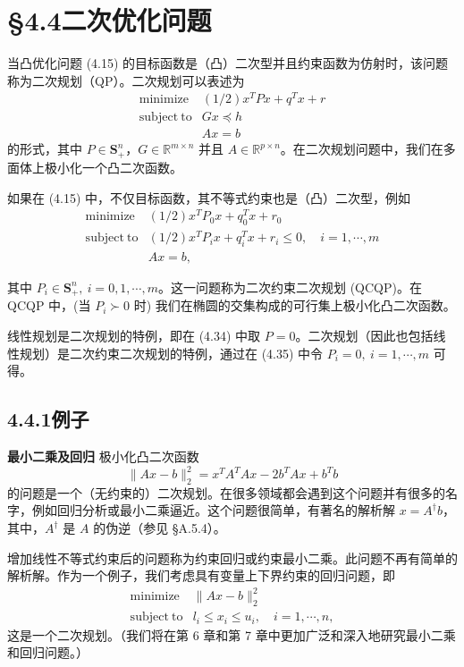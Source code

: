 \documentclass[UTF8, 12pt, fontset=fandol, oneside]{ctexart}
\begin{document}
\section*{§4.4\quad 二次优化问题}

当凸优化问题 (4.15) 的目标函数是（凸）二次型并且约束函数为仿射时，该问题称为二次规划（QP）。二次规划可以表述为
\begin{equation}
\begin{array}{ll}
\mathop{\mathrm{minimize}} & (1/2)x^TPx+q^Tx+r\\
\mathrm{subject\ to} & Gx\preceq h\\
& Ax=b
\end{array}
\tag{4.34}
\end{equation}
的形式，其中 $P\in\mathbf{S}_+^n$，$G\in\mathbb{R}^{m\times n}$ 并且 $A\in\mathbb{R}^{p\times n}$。在二次规划问题中，我们在多面体上极小化一个凸二次函数。

如果在 (4.15) 中，不仅目标函数，其不等式约束也是（凸）二次型，例如
\begin{equation}
\begin{array}{ll}
\mathop{\mathrm{minimize}} & (1/2)x^TP_0x+q_0^Tx+r_0\\
\mathrm{subject\ to} & (1/2)x^TP_ix+q_i^Tx+r_i\leq 0,\quad i=1,\cdots,m\\
& Ax=b,
\end{array}
\tag{4.35}
\end{equation}

其中 $P_i\in \mathbf{S}_+^n,\ i=0,1,\cdots,m$。这一问题称为二次约束二次规划 (QCQP)。在 QCQP 中，(当 $P_i\succ 0$ 时) 我们在椭圆的交集构成的可行集上极小化凸二次函数。

线性规划是二次规划的特例，即在 (4.34) 中取 $P=0$。二次规划（因此也包括线性规划）是二次约束二次规划的特例，通过在 (4.35) 中令 $P_i=0,\ i=1,\cdots,m$ 可得。

\subsection*{4.4.1\quad 例子}

\noindent\textbf{最小二乘及回归}\quad
极小化凸二次函数
\[
\|Ax-b\|_2^2=x^TA^TAx-2b^TAx+b^Tb
\]
的问题是一个（无约束的）二次规划。在很多领域都会遇到这个问题并有很多的名字，例如回归分析或最小二乘逼近。这个问题很简单，有著名的解析解 $x=A^\dagger b$，其中，$A^\dagger$ 是 $A$ 的伪逆（参见 \S A.5.4）。

增加线性不等式约束后的问题称为约束回归或约束最小二乘。此问题不再有简单的解析解。作为一个例子，我们考虑具有变量上下界约束的回归问题，即
\[
\begin{array}{ll}
\mathop{\mathrm{minimize}} & \|Ax-b\|_2^2\\
\mathrm{subject\ to} & l_i\leq x_i\leq u_i,\quad i=1,\cdots,n,
\end{array}
\]
这是一个二次规划。（我们将在第 6 章和第 7 章中更加广泛和深入地研究最小二乘和回归问题。）
\end{document}
